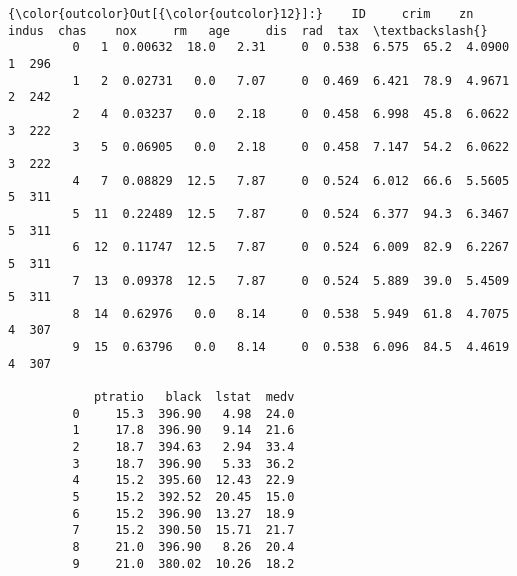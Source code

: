 \documentclass[11pt]{article}
\begin{document}
\begin{Verbatim}[commandchars=\\\{\}]
{\color{outcolor}Out[{\color{outcolor}12}]:}    ID     crim    zn  indus  chas    nox     rm   age     dis  rad  tax  \textbackslash{}
         0   1  0.00632  18.0   2.31     0  0.538  6.575  65.2  4.0900    1  296   
         1   2  0.02731   0.0   7.07     0  0.469  6.421  78.9  4.9671    2  242   
         2   4  0.03237   0.0   2.18     0  0.458  6.998  45.8  6.0622    3  222   
         3   5  0.06905   0.0   2.18     0  0.458  7.147  54.2  6.0622    3  222   
         4   7  0.08829  12.5   7.87     0  0.524  6.012  66.6  5.5605    5  311   
         5  11  0.22489  12.5   7.87     0  0.524  6.377  94.3  6.3467    5  311   
         6  12  0.11747  12.5   7.87     0  0.524  6.009  82.9  6.2267    5  311   
         7  13  0.09378  12.5   7.87     0  0.524  5.889  39.0  5.4509    5  311   
         8  14  0.62976   0.0   8.14     0  0.538  5.949  61.8  4.7075    4  307   
         9  15  0.63796   0.0   8.14     0  0.538  6.096  84.5  4.4619    4  307   
         
            ptratio   black  lstat  medv  
         0     15.3  396.90   4.98  24.0  
         1     17.8  396.90   9.14  21.6  
         2     18.7  394.63   2.94  33.4  
         3     18.7  396.90   5.33  36.2  
         4     15.2  395.60  12.43  22.9  
         5     15.2  392.52  20.45  15.0  
         6     15.2  396.90  13.27  18.9  
         7     15.2  390.50  15.71  21.7  
         8     21.0  396.90   8.26  20.4  
         9     21.0  380.02  10.26  18.2  
\end{Verbatim}
            
\end{document}
